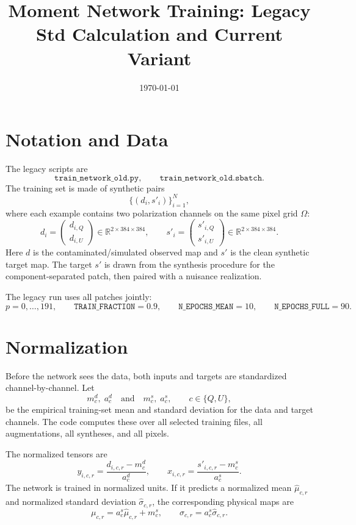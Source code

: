 \documentclass[11pt]{article}
\title{Moment Network Training: Legacy Std Calculation and Current Variant}
\author{}
\date{\today}
\newcommand{\data}{d}
\newcommand{\synth}{s'}
\newcommand{\mean}{\mu}
\newcommand{\std}{\sigma}
\newcommand{\pix}{r}
\newcommand{\chan}{c}
\newcommand{\grid}{\Omega}
\newcommand{\R}{\mathbb{R}}
\begin{document}
\maketitle

\section{Notation and Data}

The legacy scripts are
\[
  \texttt{train\_network\_old.py},
  \qquad
  \texttt{train\_network\_old.sbatch}.
\]
The training set is made of synthetic pairs
\[
  \{(\data_i,\synth_i)\}_{i=1}^N,
\]
where each example contains two polarization channels on the same pixel grid
\(\grid\):
\[
  \data_i =
  \begin{pmatrix}
    d_{i,Q}\\ d_{i,U}
  \end{pmatrix}
  \in \R^{2\times 384\times 384},
  \qquad
  \synth_i =
  \begin{pmatrix}
    s'_{i,Q}\\ s'_{i,U}
  \end{pmatrix}
  \in \R^{2\times 384\times 384}.
\]
Here \(d\) is the contaminated/simulated observed map and \(s'\) is the clean
synthetic target map.  The target \(s'\) is drawn from the synthesis procedure
for the component-separated patch, then paired with a nuisance realization.

The legacy run uses all patches jointly:
\[
  p = 0,\ldots,191,
  \qquad
  \texttt{TRAIN\_FRACTION}=0.9,
  \qquad
  \texttt{N\_EPOCHS\_MEAN}=10,
  \qquad
  \texttt{N\_EPOCHS\_FULL}=90.
\]

\section{Normalization}

Before the network sees the data, both inputs and targets are standardized
channel-by-channel.  Let
\[
  m^{d}_{\chan},\; a^{d}_{\chan}
  \quad\text{and}\quad
  m^{s}_{\chan},\; a^{s}_{\chan},
  \qquad \chan\in\{Q,U\},
\]
be the empirical training-set mean and standard deviation for the data and
target channels.  The code computes these over all selected training files,
all augmentations, all syntheses, and all pixels.

The normalized tensors are
\[
  y_{i,\chan,\pix}
  =
  \frac{
    d_{i,\chan,\pix}-m^{d}_{\chan}
  }{
    a^{d}_{\chan}
  },
  \qquad
  x_{i,\chan,\pix}
  =
  \frac{
    s'_{i,\chan,\pix}-m^{s}_{\chan}
  }{
    a^{s}_{\chan}
  }.
\]
The network is trained in normalized units.  If it predicts a normalized mean
\(\widehat{\mean}_{\chan,\pix}\) and normalized standard deviation
\(\widehat{\std}_{\chan,\pix}\), the corresponding physical maps are
\[
  \mean_{\chan,\pix}
  =
  a^s_{\chan}\widehat{\mean}_{\chan,\pix}+m^s_{\chan},
  \qquad
  \std_{\chan,\pix}
  =
  a^s_{\chan}\widehat{\std}_{\chan,\pix}.
\]
\end{document}
